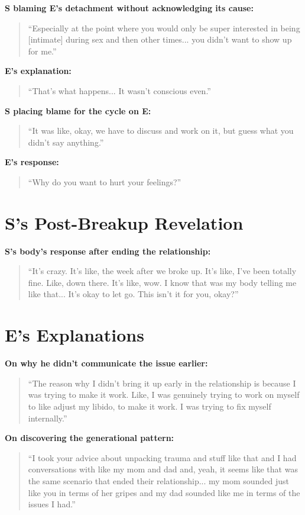 \documentclass[12pt,openany]{book}
\numberwithin{equation}{chapter}
\begin{document}
\textbf{S blaming E's detachment without acknowledging its cause:}
\begin{quote}
``Especially at the point where you would only be super interested in being [intimate] during sex and then other times... you didn't want to show up for me.''
\end{quote}

\textbf{E's explanation:}
\begin{quote}
``That's what happens... It wasn't conscious even.''
\end{quote}

\textbf{S placing blame for the cycle on E:}
\begin{quote}
``It was like, okay, we have to discuss and work on it, but guess what you didn't say anything.''
\end{quote}

\textbf{E's response:}
\begin{quote}
``Why do you want to hurt your feelings?''
\end{quote}

\section{S's Post-Breakup Revelation}

\textbf{S's body's response after ending the relationship:}
\begin{quote}
``It's crazy. It's like, the week after we broke up. It's like, I've been totally fine. Like, down there. It's like, wow. I know that was my body telling me like that... It's okay to let go. This isn't it for you, okay?''
\end{quote}

\section{E's Explanations}

\textbf{On why he didn't communicate the issue earlier:}
\begin{quote}
``The reason why I didn't bring it up early in the relationship is because I was trying to make it work. Like, I was genuinely trying to work on myself to like adjust my libido, to make it work. I was trying to fix myself internally.''
\end{quote}

\textbf{On discovering the generational pattern:}
\begin{quote}
``I took your advice about unpacking trauma and stuff like that and I had conversations with like my mom and dad and, yeah, it seems like that was the same scenario that ended their relationship... my mom sounded just like you in terms of her gripes and my dad sounded like me in terms of the issues I had.''
\end{quote}
\end{document}

